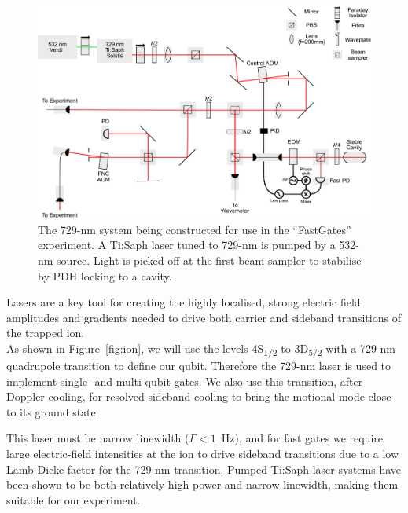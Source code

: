 \documentclass[12pt]{iopart}
\begin{document}
\begin{figure}
  \begin{center}
   \noindent\includegraphics[width=\linewidth]{figures/729_path_small.pdf}
  \end{center}
  \caption{The 729-nm system being constructed for use in the
    ``FastGates'' experiment. A Ti:Saph laser tuned to 729-nm is
    pumped by a 532-nm source. Light is picked off at the first beam
    sampler to stabilise by PDH locking to a cavity.}
  \label{fig:729}
\end{figure}

Lasers are a key tool for creating the highly localised, strong
electric field amplitudes and gradients needed to drive both carrier
and sideband transitions of the trapped ion.\\
As shown in Figure~\ref{fig:ion}, we will use the levels
4S\textsubscript{1/2} to 3D\textsubscript{5/2} with a 729-nm
quadrupole transition to define our qubit. Therefore the 729-nm laser
is used to implement single- and multi-qubit gates. We also use this
transition, after Doppler cooling, for resolved sideband cooling to
bring the motional mode close to its ground state.

This laser must be narrow linewidth ($\Gamma < 1$~Hz), and for fast
gates we require large electric-field intensities at the ion to drive
sideband transitions due to a low Lamb-Dicke factor for the 729-nm
transition.  Pumped Ti:Saph laser systems have been shown to be
both relatively high power and narrow linewidth, making them suitable
for our experiment.
\end{document}
